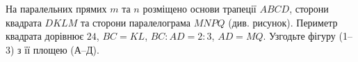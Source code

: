 \documentclass[12pt]{article}
\begin{document}
\begin{samepage}
\needspace{0.45\textheight}
\noindent\zadnum \begin{minipage}[t]{0.95\textwidth}
На паралельних прямих $m$ та $n$ розміщено основи трапеції $ABCD$, сторони квадрата $DKLM$ та сторони паралелограма $MNPQ$ (див. рисунок). Периметр квадрата дорівнює $24$, $BC=KL$, $BC:AD = 2:3$, $AD=MQ$. Узгодьте фігуру \mbox{(1--3)} з її площею \mbox{(А--Д)}.
\end{minipage}

\nmtnobreak
\nopagebreak\nbvspace{0.3cm}
\begin{center}
\begin{nmtfit}
\end{nmtfit}
\end{center}
\end{samepage}
\end{document}
